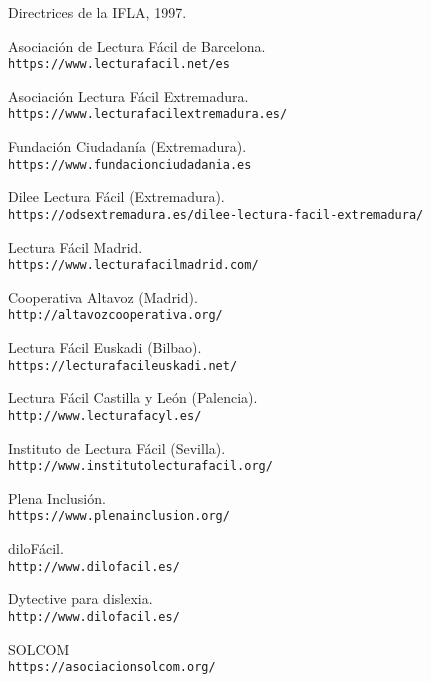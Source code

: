 \begin{thebibliography}{}

Directrices de la IFLA, 1997. 

Asociación de Lectura Fácil de Barcelona. 
\\\texttt{https://www.lecturafacil.net/es}

Asociación Lectura Fácil Extremadura. 
\\\texttt{https://www.lecturafacilextremadura.es/}

Fundación Ciudadanía (Extremadura). 
\\\texttt{https://www.fundacionciudadania.es}

Dilee Lectura Fácil (Extremadura). 
\\\texttt{https://odsextremadura.es/dilee-lectura-facil-extremadura/}

Lectura Fácil Madrid. 
\\\texttt{https://www.lecturafacilmadrid.com/}

Cooperativa Altavoz (Madrid). 
\\\texttt{http://altavozcooperativa.org/}

Lectura Fácil Euskadi (Bilbao). 
\\\texttt{https://lecturafacileuskadi.net/}

Lectura Fácil Castilla y León (Palencia). 
\\\texttt{http://www.lecturafacyl.es/}

Instituto de Lectura Fácil (Sevilla). 
\\\texttt{http://www.institutolecturafacil.org/}

Plena Inclusión. 
\\\texttt{https://www.plenainclusion.org/}

diloFácil. 
\\\texttt{http://www.dilofacil.es/}


Dytective para dislexia.
\\\texttt{http://www.dilofacil.es/}

SOLCOM
\\\texttt{https://asociacionsolcom.org/}


\end{thebibliography}



